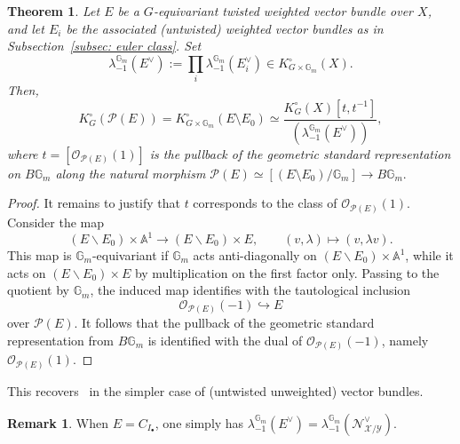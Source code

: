 \documentclass[12pt]{amsart}
\newcommand\G{\mathbb{G}}
\newcommand\Gm{\mathbb{G}_m}
\newcommand\A{\mathbb{A}}
\newcommand{\sN}{\mathscr{N}}
\newcommand{\sO}{\mathscr{O}}
\newcommand{\cP}{\mathcal{P}}
\newcommand{\cX}{\mathcal{X}}
\newcommand{\cY}{\mathcal{Y}}
\newcommand{\Kring}{K^{\circ}}
\newtheorem{Thm}[theorem]{Theorem}
\theoremstyle{definition}
\newtheorem{Rmk}[theorem]{Remark}
\begin{document}
\begin{Thm}\label{prop: twisted weighted projection formula}
    Let $E$ be a $G$-equivariant twisted weighted vector bundle over $X$, and let $E_i$ be the associated (untwisted) weighted vector bundles as in Subsection~\ref{subsec: euler class}. Set 
    $$
    \lambda_{-1}^{\Gm}(E^{\vee}):=\prod_i\lambda_{-1}^{\Gm}(E_i^{\vee}) \in \Kring_{G \times \Gm}(X).
    $$
    Then,
    \[
    \Kring_G(\cP(E))=\Kring_{G\times\Gm}(E\setminus E_0)\simeq\frac{\Kring_G(X)[t,t^{-1}]}{(\lambda_{-1}^{\Gm}(E^{\vee}))},
    \]
    where $t=[\sO_{\cP(E)}(1)]$ is the pullback of the geometric standard representation on $B\G_m$ along the natural morphism
    $
    \cP(E)\simeq[(E\setminus E_0)/\Gm]\longrightarrow B\Gm.
    $
\end{Thm}
\begin{proof}
    It remains to justify that $t$ corresponds to the class of $\sO_{\cP(E)}(1)$. Consider the map
$$
(E \smallsetminus E_0) \times \A^1 \longrightarrow (E \smallsetminus E_0) \times E,
\qquad
(v,\lambda) \longmapsto (v,\lambda v).
$$
This map is $\G_m$-equivariant if $\G_m$ acts anti-diagonally on $(E \smallsetminus E_0) \times \A^1$, while it acts on $(E \smallsetminus E_0) \times E$ by multiplication on the first factor only. Passing to the quotient by $\G_m$, the induced map identifies with the tautological inclusion
$$
\sO_{\cP(E)}(-1) \hookrightarrow E
$$
over $\cP(E)$. It follows that the pullback of the geometric standard representation from $B\G_m$ is identified with the dual of $\sO_{\cP(E)}(-1)$, namely $\sO_{\cP(E)}(1)$.
\end{proof}

This recovers~\cite[Proposition 2.5]{Edidin-Hu} in the simpler case of (untwisted unweighted) vector bundles.

\begin{Rmk}
    When $E=C_{I_\bullet}$, one simply has $\lambda_{-1}^{\Gm}(E^\vee)=\lambda_{-1}^{\Gm}(\sN_{\cX/\cY}^\vee)$.
\end{Rmk}
\end{document}
